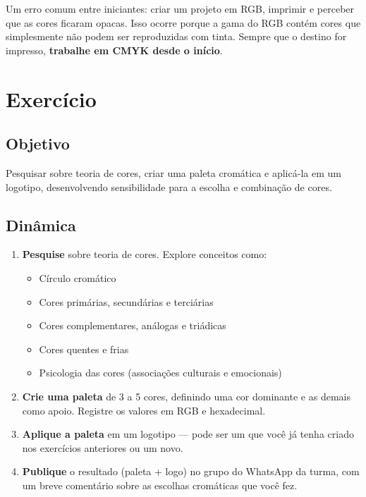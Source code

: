 \documentclass[a4paper,12pt]{article}
\begin{document}
\bigskip
\noindent Um erro comum entre iniciantes: criar um projeto em RGB, imprimir e perceber que as cores ficaram opacas. Isso ocorre porque a gama do RGB contém cores que simplesmente não podem ser reproduzidas com tinta. Sempre que o destino for impresso, \textbf{trabalhe em CMYK desde o início}.

\section{Exercício}

\subsection*{Objetivo}
Pesquisar sobre teoria de cores, criar uma paleta cromática e aplicá-la em um logotipo, desenvolvendo sensibilidade para a escolha e combinação de cores.

\subsection*{Dinâmica}
\begin{enumerate}[nosep]
  \item \textbf{Pesquise} sobre teoria de cores. Explore conceitos como:
  \begin{itemize}[nosep]
    \item Círculo cromático
    \item Cores primárias, secundárias e terciárias
    \item Cores complementares, análogas e triádicas
    \item Cores quentes e frias
    \item Psicologia das cores (associações culturais e emocionais)
  \end{itemize}
  \item \textbf{Crie uma paleta} de 3 a 5 cores, definindo uma cor dominante e as demais como apoio. Registre os valores em RGB e hexadecimal.
  \item \textbf{Aplique a paleta} em um logotipo --- pode ser um que você já tenha criado nos exercícios anteriores ou um novo.
  \item \textbf{Publique} o resultado (paleta + logo) no grupo do WhatsApp da turma, com um breve comentário sobre as escolhas cromáticas que você fez.
\end{enumerate}

\end{document}
